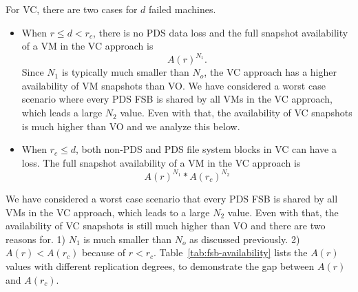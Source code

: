 For VC, there are two cases for $d$ failed machines.
\begin{itemize}
\item
When $r \le d<r_c$,  there is no PDS data loss and  
the full snapshot availability of a VM in the VC approach is 
\[
A(r)^{N_1}.
\]
Since $N_1$ is typically much smaller than $N_o$, 
the VC approach has a higher availability of VM snapshots than VO.
We have considered a worst case scenario where
every PDS FSB is shared by all VMs in the VC approach, which leads a large $N_2$ value. 
Even with that, the availability of VC snapshots is much higher than VO and we analyze  this below.

\item
When $r_c \leq d$, both non-PDS and PDS file system blocks in VC can have a loss.
The full snapshot availability of  a VM in the VC approach is
\[
A(r)^{N_1} * A(r_c)^{N_2}
\]
\end{itemize} 
We have considered a worst case scenario that
every PDS FSB is shared by all VMs in the VC approach, which leads to a large $N_2$ value. 
Even with that, the availability of VC snapshots is still much higher than VO and  
there are two reasons for.  1) $N_1$ is much smaller than $N_o$ as discussed previously.
2)  $A(r) < A(r_c)$ because of  $r < r_c$.  
Table~\ref{tab:fsb-availability} lists the $A(r)$ values with
different replication degrees, to demonstrate the gap between  $A(r)$ and  $A(r_c)$.


